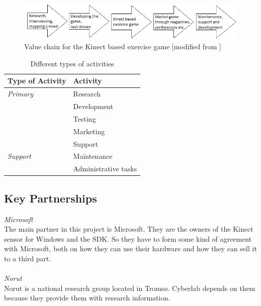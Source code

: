 \begin{figure}
\begin{center}
\includegraphics[scale=0.7]{valuechaincase}
\caption[Value Chain for the Kinect Based Exercise Game]{Value chain for the Kinect based exercise game [modified from \cite{osterwalderthesis}]}
\label{fig:ValueChainCase}
\end{center}
\end{figure}

\begin{table}
\centering
    \begin{tabular}{|l|l|}
        \hline
        \textbf{Type of Activity} & \textbf{Activity} \\ \hline
        \emph{Primary} & Research \\ \cline{2-2}
        & Development \\ \cline{2-2}
	 	& Testing \\ \cline{2-2}
	 	& Marketing \\ \cline{2-2}
	 	& Support \\ \hline
	 	 \emph{Support} & Maintenance \\ \cline{2-2}
	   	& Administrative tasks \\
       \hline
    \end{tabular}
    \caption[Different types of activities ]{Different types of activities}
    \label{tab:activities}
\end{table}

\newpage

\subsection{Key Partnerships}
\emph{Microsoft} \\
The main partner in this project is Microsoft. They are the owners of the Kinect sensor for Windows and the SDK. So they have to form some kind of agreement with Microsoft, both on how they can use their hardware and how they can sell it to a third part. \\ \\ 
\emph{Norut} \\
Norut is a national research group located in Tromsø. Cyberlab depends on them because they provide them with research information.  \\ \\ 

